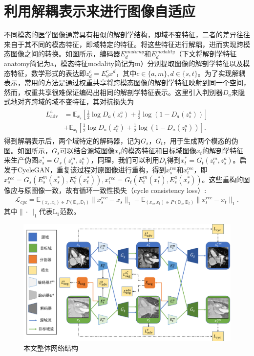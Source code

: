 \section{利用解耦表示来进行图像自适应}
不同模态的医学图像通常具有相似的解剖学结构，即域不变特征，二者的差异往往来自于其不同的模态特征，即域特定的特征。将这些特征进行解耦，进而实现跨模态图像之间的转换。如图所示，编码器$E_d^{anatomy}$和$E_d^{modality}$（下文将解剖学特征anatomy简记为a，模态特征modality简记为m）分别提取图像的解剖学特征以及模态特征，数学形式的表达即$z_d^{c} = E^c_d{x^d}$，其中$c\in \{a,m\}, d\in \{s,t\}$。为了实现解耦表示，常用的方法是通过权重共享将跨模态图像的解剖学特征映射到同一个空间，然而，权重共享很难保证编码出相同的解剖学特征表示。这里引入判别器$D_a$来隐式地对齐跨域的域不变特征，其对抗损失为
\begin{align}
\begin{aligned}L_{\mathrm{adv}}^{\text {a }} &=\mathbb{E}_{x_s}\left[\frac{1}{2} \log D_a\left(z_s^a\right)+\frac{1}{2} \log \left(1-D_a\left(z_s^a\right)\right)\right] \\&+\mathbb{E}_{x_t}\left[\frac{1}{2} \log D_a\left(z_t^a\right)+\frac{1}{2} \log \left(1-D_a\left(z_t^a\right)\right)\right].\end{aligned}
\end{align}
得到解耦表示后，两个域特定的解码器，记为$G_s$，$G_t$，用于生成两个模态的伪图。如图所示，$G_s$可以结合源域图像$x_s$的模态特征和目标域图像$x_t$的解剖学特征来生产伪图$x_s^*=G_s(z_s^{m},z_t^{a})$，同理，我们可以利用$D_t$得到$x_t^*=G_t(z_t^{m},z_s^{a})$。启发于CycleGAN，重复该过程对原图像进行重构，得到$x_s^{\mathrm{rec}}$和$x_t^{\mathrm{rec}}$，即$x_s^{rec} = G_s(E_s^{m}(x_s^*),E_t^{a}(x_t^*)), x_t^{rec} = G_t(E_t^{m}(x_t^*),E_s^{a}(x_s^*))$。这些重构的图像应与原图像一致，故有循环一致性损失（cycle consistency loss）:
\begin{align}
\mathcal{L}_{cyc} = \mathbb{E}_{(x_s,x_t)\in P(\mathbb{D}_s,\mathbb{D}_t)}\|x_s^{rec}-x_s\|_1 + \mathbb{E}_{(x_s,x_t)\in P(\mathbb{D}_s,\mathbb{D}_t)}\|x_t^{rec}-x_t\|_1 .
\end{align}
其中$\|\cdot \|_1$代表$\mathrm{L}_1$范数。
\begin{figure}
    \centering
    \includegraphics[width=\textwidth]{image/chap03/network structure.pdf}
    \caption{本文整体网络结构}
    \label{fig:network}
\end{figure}

